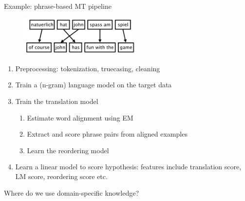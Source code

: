 \documentclass[usenames,dvipsnames,11pt,aspectratio=169]{beamer}
\newcommand{\pdfnote}[1]{}
\begin{document}
\begin{frame}
    {Example: phrase-based MT pipeline}
    \begin{figure}
        \includegraphics[height=2cm]{figures/pbmt}
    \end{figure}
    \vspace{-2em}
    \begin{enumerate}
        \item Preprocessing: tokenization, truecasing, cleaning
        \item Train a (n-gram) language model on the target data
        \item Train the translation model
            \begin{enumerate}
                \item Estimate word alignment using EM
                \item Extract and score phrase pairs from aligned examples
                \item Learn the reordering model 
            \end{enumerate}
        \item Learn a linear model to score hypothesis: features include translation score, LM score, reordering score etc.
    \end{enumerate}
    Where do we use domain-specific knowledge?
    \pdfnote{tokenization, feature engineering}
    \pdfnote{Note that we do not explicitly use syntax knowledge, and they are simplified to learned phrase pairs and reordering probabilities, which is big progress from rule-based system in the 60's.
    There are grammar based systems though, e.g. Hiero system from Chiang et al.}
\end{frame}
\end{document}
